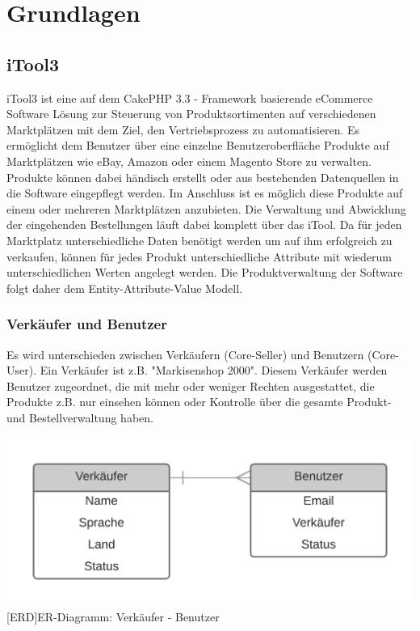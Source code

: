 \section{Grundlagen}
	
	\subsection{iTool3}
	
	iTool3 ist eine auf dem CakePHP 3.3 - Framework basierende eCommerce Software Lösung zur Steuerung von Produktsortimenten auf verschiedenen Marktplätzen mit dem Ziel, den
	Vertriebsprozess zu automatisieren. Es ermöglicht dem Benutzer über eine einzelne Benutzeroberfläche Produkte auf Marktplätzen wie eBay, Amazon oder einem Magento Store
	zu verwalten. Produkte können dabei händisch erstellt oder aus bestehenden Datenquellen in die Software	eingepflegt werden. Im Anschluss ist es möglich diese Produkte auf einem oder mehreren Marktplätzen anzubieten. Die Verwaltung und Abwicklung der eingehenden Bestellungen läuft dabei komplett über das iTool.
	Da für jeden Marktplatz unterschiedliche Daten benötigt werden um auf ihm erfolgreich zu verkaufen, können für jedes Produkt unterschiedliche Attribute mit wiederum unterschiedlichen Werten angelegt werden. Die Produktverwaltung der Software folgt daher dem Entity-Attribute-Value Modell.
	
	
	\subsubsection{Verkäufer und Benutzer}
	
	Es wird unterschieden zwischen Verkäufern (Core-Seller) und Benutzern (Core-User). Ein Verkäufer ist z.B. "Markisenshop 2000". Diesem Verkäufer werden Benutzer zugeordnet, die mit mehr oder weniger Rechten ausgestattet, die Produkte z.B. nur einsehen können oder Kontrolle über die gesamte Produkt- und Bestellverwaltung haben.\\
	\begin{minipage}{\linewidth}
		\vspace{1em}
		\centering
		\includegraphics[width=0.6\linewidth]{img/ERD_Seller_User_complete}
		[ERD]{ER-Diagramm: Verkäufer - Benutzer}
		\label{fig:header}
		\vspace{1em}
	\end{minipage}

